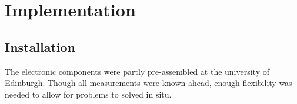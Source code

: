

% 







\section{Implementation}\label{implementation}

\subsection{Installation}\label{installation}

The electronic components were partly pre-assembled at the university of
Edinburgh. Though all measurements were known ahead, enough flexibility
was needed to allow for problems to solved in situ.

